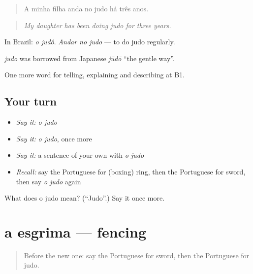 \begin{quote}
A minha filha anda no judo há três anos.
\end{quote}

\begin{quote}
\emph{My daughter has been doing judo for three years.}
\end{quote}

In Brazil: \emph{o judô}. \emph{Andar no judo} — to do judo regularly.

\begin{cousinweb}
\emph{judo} was borrowed from Japanese \emph{jūdō} \textquotedblleft{}the gentle way\textquotedblright{}.
\end{cousinweb}

\begin{grammarlens}[title={What you've built}]
One more word for telling, explaining and describing at B1.
\end{grammarlens}

\subsection*{Your turn}
\begin{itemize}
\raggedright
  \item \emph{Say it:} \emph{o judo}
  \item \emph{Say it:} \emph{o judo}, once more
  \item \emph{Say it:} a sentence of your own with \emph{o judo}
  \item \emph{Recall:} say the Portuguese for (boxing) ring, then the Portuguese for sword, then say \emph{o judo} again
\end{itemize}

\begin{tcolorbox}[breakable,colback=teal!4,colframe=teal!35!black,title={Before you move on}]
What does o judo mean? (\textquotedblleft{}Judo\textquotedblright{}.) Say it once more.
\end{tcolorbox}
\section[a esgrima]{a esgrima — fencing}

\label{lesson:PT-C514-esgrima}



\begin{quote}
Before the new one: say the Portuguese for sword, then the Portuguese for judo.
\end{quote}

